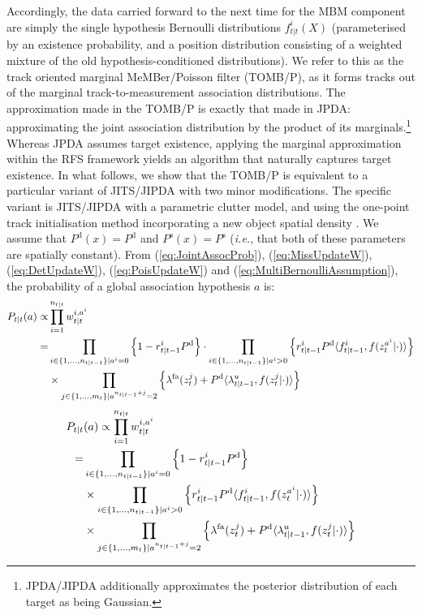 \documentclass[journal,twoside]{IEEEtran}
\theoremstyle{plain}
\begin{document}
Accordingly, the data carried forward to the next time for the MBM component are simply the single hypothesis Bernoulli distributions $f_{t|t}^i(X)$ (parameterised by an existence probability, and a position distribution consisting of a weighted mixture of the old hypothesis-conditioned distributions). We refer to this as the track oriented marginal MeMBer/Poisson filter (TOMB/P), as it forms tracks out of the marginal track-to-measurement association distributions. 
The approximation made in the TOMB/P is exactly that made in JPDA: approximating the joint association distribution by the product of its marginals.\footnote{JPDA/JIPDA additionally approximates the posterior distribution of each target as being Gaussian.\label{fn:JPDAGaussian}} Whereas JPDA assumes target existence, applying the marginal approximation within the RFS framework yields an algorithm that naturally captures target existence. 
In what follows, we show that the TOMB/P is equivalent to a particular variant of JITS/JIPDA with two minor modifications. The specific variant is JITS/JIPDA with a parametric clutter model, and using the one-point track initialisation method incorporating a new object spatial density \cite[p324]{ChaMor11}. We assume that $P^{\mathrm{d}}(x)=P^{\mathrm{d}}$ and $P^{\mathrm{s}}(x)=P^{\mathrm{s}}$ (\textit{i.e.}\xspace, that both of these parameters are spatially constant). From (\ref{eq:JointAssocProb}), (\ref{eq:MissUpdateW}), (\ref{eq:DetUpdateW}), (\ref{eq:PoisUpdateW}) and (\ref{eq:MultiBernoulliAssumption}), the probability of a global association hypothesis $a$ is:
%
\ifCLASSOPTIONdraftcls
\begin{align}
P_{t|t}(a) \propto& \prod_{i=1}^{n_{t|t}} w^{i,a^i}_{t|t} \notag \\
=& \prod_{i\in\{1,\dots,n_{t|t-1}\}|a^i=0} \left\{ 1- r^i_{t|t-1}P^{\mathrm{d}} \right\} 
\cdot \prod_{i\in\{1,\dots,n_{t|t-1}\}|a^i>0} \left\{r^i_{t|t-1}P^{\mathrm{d}} \langle f^i_{t|t-1},f(z_t^{a^i}|\cdot)\rangle \right\} \notag\\
& \times \prod_{j\in\{1,\dots,m_t\}|a^{n_{t|t-1}+j}=2}\left\{\lambda^\mathrm{fa}(z_t^j)+P^{\mathrm{d}}\langle\lambda^u_{t|t-1},f(z_t^j|\cdot)\rangle\right\} \label{eq:JointEventProb1}
\end{align}
\else
\begin{align}
P_{t|t}&(a) \propto \prod_{i=1}^{n_{t|t}} w^{i,a^i}_{t|t} \notag \\
=& \prod_{i\in\{1,\dots,n_{t|t-1}\}|a^i=0} \left\{ 1- r^i_{t|t-1}P^{\mathrm{d}} \right\}  \notag\\
& \times \prod_{i\in\{1,\dots,n_{t|t-1}\}|a^i>0} \left\{r^i_{t|t-1}P^{\mathrm{d}} \langle f^i_{t|t-1},f(z_t^{a^i}|\cdot)\rangle \right\} \notag\\
& \times \prod_{j\in\{1,\dots,m_t\}|a^{n_{t|t-1}+j}=2}\left\{\lambda^\mathrm{fa}(z_t^j)+P^{\mathrm{d}}\langle\lambda^u_{t|t-1},f(z_t^j|\cdot)\rangle\right\} \label{eq:JointEventProb1}
\end{align}
\end{document}
